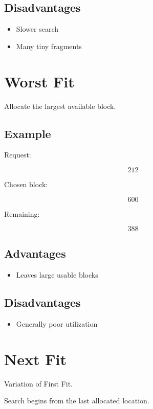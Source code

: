 \subsection{Disadvantages}

\begin{itemize}
\item Slower search
\item Many tiny fragments
\end{itemize}

\section{Worst Fit}

Allocate the largest available block.

\subsection{Example}

Request:

\[
212
\]

Chosen block:

\[
600
\]

Remaining:

\[
388
\]

\subsection{Advantages}

\begin{itemize}
\item Leaves large usable blocks
\end{itemize}

\subsection{Disadvantages}

\begin{itemize}
\item Generally poor utilization
\end{itemize}

\section{Next Fit}

Variation of First Fit.

Search begins from the last allocated location.

